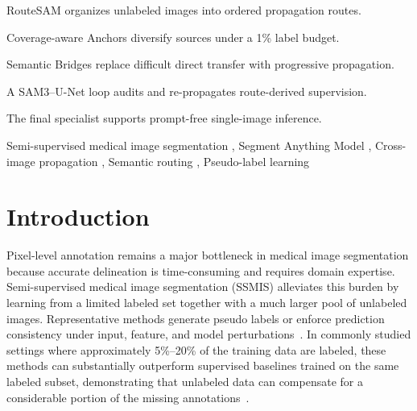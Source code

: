 \documentclass[a4paper,fleqn]{cas-dc}
\begin{document}

\begin{highlights}
\item RouteSAM organizes unlabeled images into ordered propagation routes.
\item Coverage-aware Anchors diversify sources under a 1\% label budget.
\item Semantic Bridges replace difficult direct transfer with progressive propagation.
\item A SAM3--U-Net loop audits and re-propagates route-derived supervision.
\item The final specialist supports prompt-free single-image inference.
\end{highlights}



\begin{keywords}
Semi-supervised medical image segmentation \sep
Segment Anything Model \sep
Cross-image propagation \sep
Semantic routing \sep
Pseudo-label learning
\end{keywords}

\maketitle




\section{Introduction}

Pixel-level annotation remains a major bottleneck in medical image segmentation because accurate delineation is time-consuming and requires domain expertise. Semi-supervised medical image segmentation (SSMIS) alleviates this burden by learning from a limited labeled set together with a much larger pool of unlabeled images. Representative methods generate pseudo labels or enforce prediction consistency under input, feature, and model perturbations~\cite{tarvainen2017meanteacher,chen2021cps,luo2022crossteaching,wu2022mcnet,bai2023bcp,assefa2025dycon}. In commonly studied settings where approximately 5\%--20\% of the training data are labeled, these methods can substantially outperform supervised baselines trained on the same labeled subset, demonstrating that unlabeled data can compensate for a considerable portion of the missing annotations~\cite{luo2022crossteaching,bai2023bcp,assefa2025dycon}.
\end{document}
